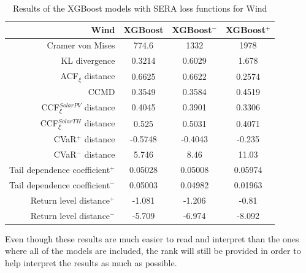\newpage
\begin{table}[ht]
    \centering
    \footnotesize
    \begin{tabular}[r]{r|c|cc}
        \toprule
        \textbf{Wind}&XGBoost&XGBoost$^-$&XGBoost$^+$ \\
        \midrule            
        Cramer von Mises&774.6&1332&1978 \\
        KL divergence&0.3214&0.6029&1.678 \\
        ACF$_\xi$ distance&0.6625&0.6622&0.2574 \\
        \midrule
        CCMD&0.3549&0.3584&0.4519 \\
        CCF$_\xi^{Solar PV}$ distance&0.4045&0.3901&0.3306 \\
        CCF$_\xi^{Solar TH}$ distance&0.525&0.5031&0.4071 \\
        \midrule
        CVaR$^+$ distance&-0.5748&-0.4043&-0.235 \\
        CVaR$^-$ distance&5.746&8.46&11.03 \\
        Tail dependence coefficient$^+$&0.05028&0.05008&0.05974 \\
        Tail dependence coefficient$^-$&0.05003&0.04982&0.01963 \\
        Return level distance$^+$&-1.081&-1.206&-0.81 \\
        Return level distance$^-$&-5.709&-6.974&-8.092 \\
        \bottomrule
    \end{tabular}
    \caption{Results of the XGBoost models with SERA loss functions for Wind\label{long}}
    \label{table:results-custom-loss}
\end{table}

Even though these results are much easier to read and interpret than the ones where all of the models are included, the rank will still be provided in order to help interpret the results as much as possible. 

